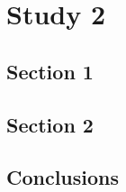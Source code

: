 \chapter{Study 2} \label{chap:study_2}

\section{Section 1}

\section{Section 2}

\section{Conclusions}